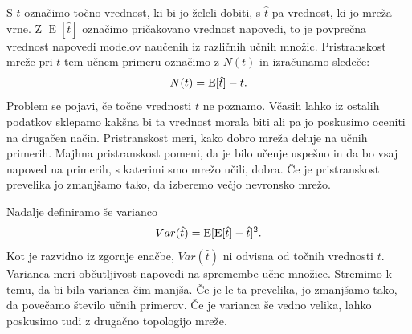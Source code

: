 \documentclass[mat1]{fmfdelo}
\begin{document}
S $t$ označimo točno vrednost, ki bi jo želeli dobiti, s $\hat{t}$ pa vrednost, ki jo mreža vrne. Z $\operatorname{E}[\hat{t}]$ označimo pričakovano vrednost napovedi, to je povprečna vrednost napovedi modelov naučenih iz različnih učnih množic. Pristranskost mreže pri $t$-tem učnem primeru označimo z $N(t)$ in izračunamo sledeče:
%
\begin{equation}
N(t) = \operatorname{E}[\hat{t}] - t \text.
\end{equation}
%
Problem se pojavi, če točne vrednosti $t$ ne poznamo. Včasih lahko iz ostalih podatkov sklepamo kakšna bi ta vrednost morala biti ali pa jo poskusimo oceniti na drugačen način. Pristranskost meri, kako dobro mreža deluje na učnih primerih. Majhna pristranskost pomeni, da je bilo učenje uspešno in da bo vsaj napoved na primerih, s katerimi smo mrežo učili, dobra. Če je pristranskost prevelika jo zmanjšamo tako, da izberemo večjo nevronsko mrežo.

Nadalje definiramo še varianco
%
\begin{equation}
Var(\hat{t}) = \operatorname{E}[\operatorname{E}[\hat{t}] -\hat{t}]^2\text.
\end{equation}
%
Kot je razvidno iz zgornje enačbe, $Var(\hat{t})$ ni odvisna od točnih vrednosti $t$. Varianca meri  občutljivost napovedi na spremembe učne množice. Stremimo k temu, da bi bila varianca čim manjša. Če je le ta prevelika, jo zmanjšamo tako, da povečamo število učnih primerov. Če je varianca še vedno velika, lahko poskusimo tudi z drugačno topologijo mreže.
\end{document}
